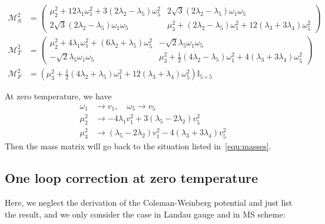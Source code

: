\documentclass[12pt]{article}
\begin{document}
\begin{subequations}
    \label{equ:field_dependent_mass_matrices}
    \begin{align}
        \label{equ:ms2}
        \mathcal{M}_S^2 &= \begin{pmatrix}
            \mu_2^2 + 12\lambda_1 \omega_1^2 + 3(2\lambda_2 -\lambda_5)\omega_5^2 & 2\sqrt{3}(2\lambda_2 -\lambda_5)\omega_1\omega_5 \\
            2\sqrt{3}(2\lambda_2 -\lambda_5)\omega_1\omega_5 & \mu_3^2 + (2\lambda_2 -\lambda_5)\omega_1^2 + 12(\lambda_3 + 3\lambda_4)\omega_5^2
        \end{pmatrix}\\
        \label{equ:mt2}
        \mathcal{M}_T^2 &= \begin{pmatrix}
            \mu_2^2 + 4\lambda_1 \omega_1^2 + (6\lambda_2+\lambda_5)\omega_5^2 & -\sqrt{2}\lambda_5\omega_1\omega_5 \\
            -\sqrt{2}\lambda_5\omega_1 \omega_5 & \mu_3^2 + \frac{1}{2}(4\lambda_2 - \lambda_5)\omega_1^2 + 4(\lambda_3 + 3\lambda_4)\omega_5^2
        \end{pmatrix}\\
        \mathcal{M}_F^2 &= \left(\mu_3^2 + \frac{1}{2}(4\lambda_2+\lambda_5)\omega_1^2+12(\lambda_3+\lambda_4)\omega_5^2\right)\mathbb{I}_{5\times5}
    \end{align}
\end{subequations}

At zero temperature, we have
\begin{align}
    \omega_1 &\to v_1, \quad \omega_5 \to v_5 \\
    \mu_2^2 &\to -4\lambda_1 v_1^2 + 3(\lambda_5-2\lambda_2)v_5^2 \\
    \mu_3^2 &\to (\lambda_5-2\lambda_2)v_1^2 - 4(\lambda_3+3\lambda_4)v_5^2
\end{align}
Then the mass matrix will go back to the situation listed in~\autoref{equ:masses}.


\subsection{One loop correction at zero temperature}

Here, we neglect the derivation of the Coleman-Weinberg potential and just list the result, and we only consider the case in Landau gauge and in $\overline{\text{MS}}$ scheme:
\end{document}
